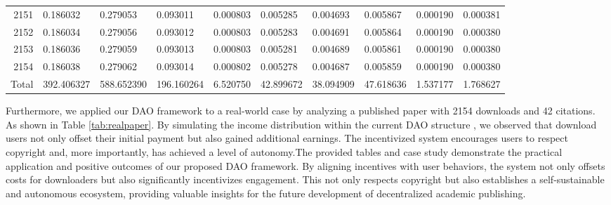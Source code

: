\documentclass[lettersize,journal]{IEEEtran}
\begin{document}
\begin{table}[t!]
\begin{center}
\begin{tabular}{r|l|l|l|l|l|l|l|l|l}
      2151           & 0.186032                              & 0.279053           & 0.093011                                & 0.000803                             & 0.005285           & 0.004693           & 0.005867           & 0.000190          & 0.000381      \\
      2152           & 0.186034                              & 0.279056           & 0.093012                                & 0.000803                             & 0.005283           & 0.004691           & 0.005864           & 0.000190          & 0.000380      \\
      2153           & 0.186036                              & 0.279059           & 0.093013                                & 0.000803                             & 0.005281           & 0.004689           & 0.005861           & 0.000190          & 0.000380      \\
      2154           & 0.186038                              & 0.279062           & 0.093014                                & 0.000802                             & 0.005278           & 0.004687           & 0.005859           & 0.000190          & 0.000380      \\
      Total          & 392.406327                            & 588.652390         & 196.160264                              & 6.520750                             & 42.899672          & 38.094909          & 47.618636          & 1.537177          & 1.768627      \\
    \end{tabular}
  \end{center}
\end{table}

Furthermore, we applied our DAO framework to a real-world case by analyzing a published paper with 2154 downloads and 42 citations. As shown in Table \ref{tab:realpaper}. By simulating the income distribution within the current DAO structure \cite{efron1994introduction}, we observed that download users not only offset their initial payment but also gained additional earnings. The incentivized system encourages users to respect copyright and, more importantly, has achieved a level of autonomy.The provided tables and case study demonstrate the practical application and positive outcomes of our proposed DAO framework. By aligning incentives with user behaviors, the system not only offsets costs for downloaders but also significantly incentivizes engagement. This not only respects copyright but also establishes a self-sustainable and autonomous ecosystem, providing valuable insights for the future development of decentralized academic publishing.
\end{document}
